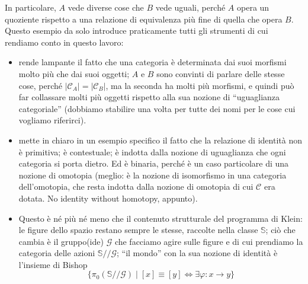 \color{blue}
In particolare, $A$ vede diverse cose che $B$ vede uguali, perché $A$ opera un quoziente rispetto a una relazione di equivalenza più fine di quella che opera $B$. Questo esempio da solo introduce praticamente tutti gli strumenti di cui rendiamo conto in questo lavoro:
\begin{itemize}
	\item rende lampante il fatto che una categoria è determinata dai suoi morfismi molto più che dai suoi oggetti; $A$ e $B$ sono convinti di parlare delle stesse cose, perché $|\mathcal C_A|=|\mathcal C_B|$, ma la seconda ha molti più morfismi, e quindi può far collassare molti più oggetti rispetto alla sua nozione di ``uguaglianza categoriale'' (dobbiamo stabilire una volta per tutte dei nomi per le cose cui vogliamo riferirci).
	\item mette in chiaro in un esempio specifico il fatto che la relazione di identità non è primitiva; è contestuale; è indotta dalla nozione di uguaglianza che ogni categoria si porta dietro. Ed è binaria, perché è un caso particolare di una nozione di omotopia (meglio: è la nozione di isomorfismo in una categoria dell'omotopia, che resta indotta dalla nozione di omotopia di cui $\mathcal C$ era dotata. No identity without homotopy, appunto).
	\item Questo è né più né meno che il contenuto strutturale del programma di Klein: le figure dello spazio restano sempre le stesse, raccolte nella classe $\mathbb S$; ciò che cambia è il gruppo(ide) $\mathcal G$ che facciamo agire sulle figure e di cui prendiamo la categoria delle azioni $\mathbb S /\!\!/\mathcal G$; ``il mondo'' con la sua nozione di identità è l'insieme di Bishop
	      \[\Big\{ \pi_0(\mathbb S/\!\!/\mathcal G) \mid [x] \equiv [y] \iff \exists \varphi : x \to y\Big\}\]

\end{itemize}
